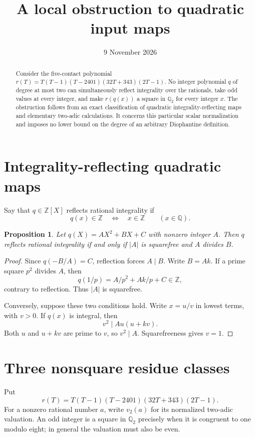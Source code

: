 \documentclass[11pt,a4paper]{article}
\title{A local obstruction to quadratic input maps}
\author{}\date{9 November 2026}
\newtheorem{proposition}[theorem]{Proposition}
\newcommand{\Q}{\mathbb Q}\newcommand{\Z}{\mathbb Z}
\begin{document}
\maketitle
\begin{abstract}
Consider the five-contact polynomial
$r(T)=T(T-1)(T-2401)(32T+343)(2T-1)$.
No integer polynomial $q$ of degree at most two can simultaneously
reflect integrality over the rationals, take odd values at every
integer, and make $r(q(x))$ a square in $\Q_2$ for every integer $x$.
The obstruction follows from an exact classification of quadratic
integrality-reflecting maps and elementary two-adic calculations.
It concerns this particular scalar normalization and imposes no
lower bound on the degree of an arbitrary Diophantine definition.
\end{abstract}

\section{Integrality-reflecting quadratic maps}

Say that $q\in\Z[X]$ reflects rational integrality if
\[
        q(x)\in\Z\quad\Longleftrightarrow\quad x\in\Z
        \qquad(x\in\Q).
\]

\begin{proposition}\label{prop:reflection}
Let $q(X)=AX^2+BX+C$ with nonzero integer $A$.
Then $q$ reflects rational integrality if and only if
$|A|$ is squarefree and $A$ divides $B$.
\end{proposition}
\begin{proof}
Since $q(-B/A)=C$, reflection forces $A\mid B$.
Write $B=Ak$. If a prime square $p^2$ divides $A$, then
\[
 q(1/p)=A/p^2+Ak/p+C\in\Z,
\]
contrary to reflection. Thus $|A|$ is squarefree.

Conversely, suppose these two conditions hold. Write $x=u/v$
in lowest terms, with $v>0$. If $q(x)$ is integral, then
\[
                 v^2\mid A u(u+kv).
\]
Both $u$ and $u+kv$ are prime to $v$, so $v^2\mid A$.
Squarefreeness gives $v=1$.
\end{proof}

\section{Three nonsquare residue classes}

Put
\[
             r(T)=T(T-1)(T-2401)(32T+343)(2T-1).
\]
For a nonzero rational number $a$, write $v_2(a)$ for its
normalized two-adic valuation. An odd integer is a square in
$\Q_2$ precisely when it is congruent to one modulo eight;
in general the valuation must also be even.
\end{document}
